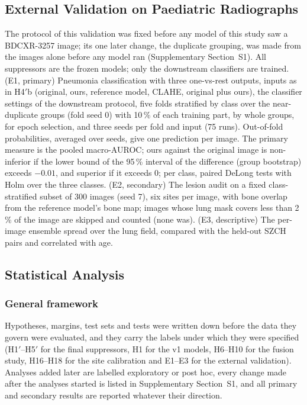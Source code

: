 \subsection{External Validation on Paediatric Radiographs}
\label{sec:m-bdcxr}
The protocol of this validation was fixed before any model of this study saw a BDCXR-3257 image; its one later change, the duplicate
grouping, was made from the images alone before any model ran (Supplementary Section~S1). All suppressors are the frozen models; only the
downstream classifiers are trained. (E1, primary) Pneumonia classification with three one-vs-rest outputs, inputs as in H4$'$b (original,
ours, reference model, CLAHE, original plus ours), the classifier settings of the downstream protocol, five folds stratified by class over
the near-duplicate groups (fold seed 0) with 10\,\% of each training part, by whole groups, for epoch selection, and three seeds per fold and
input (75 runs). Out-of-fold probabilities, averaged over seeds, give one prediction per image. The primary measure is the pooled
macro-AUROC; ours against the original image is non-inferior if the lower bound of the 95\,\% interval of the difference (group bootstrap)
exceeds $-0.01$, and superior if it exceeds 0; per class, paired DeLong tests with Holm over the three classes. (E2, secondary) The lesion
audit on a fixed class-stratified subset of 300 images (seed 7), six sites per image, with bone overlap from the reference model's bone map;
images whose lung mask covers less than 2\,\% of the image are skipped and counted (none was). (E3, descriptive) The per-image ensemble
spread over the lung field, compared with the held-out SZCH pairs and correlated with age.

\subsection{Statistical Analysis}
\label{sec:m-stats}

\subsubsection{General framework}
Hypotheses, margins, test sets and tests were written down before the data they govern were evaluated, and they carry the labels under
which they were specified (H1$'$--H5$'$ for the final suppressors, H1 for the v1 models, H6--H10 for the fusion study, H16--H18 for the site
calibration and E1--E3 for the external validation). Analyses added later are labelled exploratory or post hoc, every change made after the
analyses started is listed in Supplementary Section~S1, and all primary and secondary results are reported whatever their direction.

